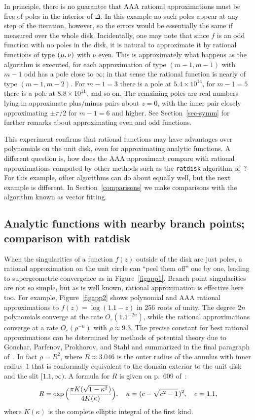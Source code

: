 \documentclass[final]{siamltex}
\def\Oe{O_{\varepsilon}}
\begin{document}
In principle, there is no guarantee that AAA rational
approximations must be free of poles in the interior of $\Delta$.
In this example no such poles appear at any step of the iteration,
however, so the errors would be essentially the same if measured
over the whole disk.  Incidentally, one may note that since $f$
is an odd function with no poles in the disk, it is natural to
approximate it by rational functions of type $(\kern .5pt \mu,\nu)$
with $\nu$ even.  This is approximately what happens as the
algorithm is executed, for each approximation of type $(m-1,m-1)$
with $m-1$ odd has a pole close to $\infty$; in that sense the
rational function is nearly of type $(m-1,m-2)$.  For $m-1 = 3$
there is a pole at $5.4\times 10^{14}$, for $m-1 = 5$ there is a
pole at $8.8\times 10^{11}$, and so on.  The remaining poles are
real numbers lying in approximate plus/minus pairs about $z=0$,
with the inner pair closely approximating $\pm \pi/2$ for $m-1 =
6$ and higher.  See Section~\ref{sec-symm} for further remarks
about approximating even and odd functions.

This experiment confirms that rational functions may have
advantages over polynomials on the unit disk, even for
approximating analytic functions.  A different question is, how
does the AAA approximant compare with rational approximations
computed by other methods such as the {\tt ratdisk} algorithm
of~\cite{gpt}?  For this example, other algorithms can do about
equally well, but the next example is different.
In Section~\ref{comparisons} we make comparisons with the algorithm
known as vector fitting.

\subsection{\label{sec-app2}Analytic functions with nearby branch points;
comparison with ratdisk}
When the singularities of a function $f(z)$ outside of the disk
are just poles, a rational approximation on the unit circle can
``peel them off'' one by one, leading to supergeometric convergence
as in Figure~\ref{figapp1}.  Branch point singularities are not so
simple, but as is well known, rational approximation is effective
here too.  For example, Figure~\ref{figapp2} shows polynomial
and AAA rational approximations to $f(z) = \log(1.1-z)$ in 256
roots of unity.  The degree $2n$ polynomials converge at the rate
$\Oe(1.1^{-2n})$, while the rational approximations converge at
a rate $\Oe(\rho^{-n})$ with $\rho \approx 9.3$.
The precise constant for best rational approximations can be
determined by methods of potential theory due to Gonchar,
Parfenov, Prokhorov, and Stahl and summarized in the final paragraph
of~\cite{levinsaff}.  In fact $\rho = R^2$, where $R\approx 3.046$
is the outer radius of the annulus with inner radius~$1$ that is conformally
equivalent to the domain exterior to the unit disk and the slit $[1.1,\infty)$.
A formula for $R$ is given on p.~609 of~\cite{gk}:
\begin{equation}
R = \exp\Big({\pi K(\sqrt{1-\kappa^2}\kern 1pt)\over 4 K(\kappa)}\Big), \quad
\kappa = (c-\sqrt{c^2-1}\kern 1pt)^2, \quad c = 1.1,
\label{elliptic}
\end{equation}
where $K(\kappa)$ is the complete elliptic integral of the first kind.
\end{document}
